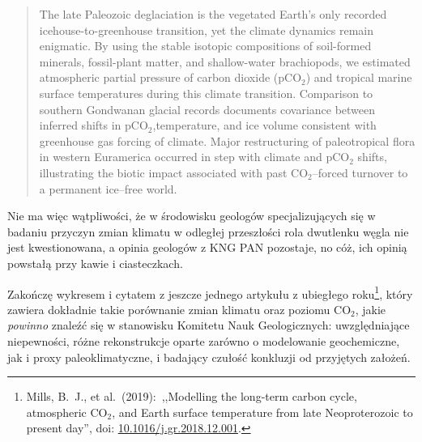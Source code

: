 \documentclass[12pt]{article}
\newcommand{\doi}[1]{doi: \href{htts://doi.org/#1}{#1}}
\begin{document}
\begin{quotation}
	The late Paleozoic deglaciation is the vegetated Earth’s only recorded icehouse-to-greenhouse transition, yet the climate dynamics remain enigmatic. By using the stable isotopic compositions of soil-formed minerals, fossil-plant matter, and shallow-water brachiopods, we estimated atmospheric partial pressure of carbon dioxide (pCO$_2$) and tropical marine surface temperatures during this climate transition. Comparison to southern Gondwanan glacial records documents covariance between inferred shifts in pCO$_2$,temperature, and ice volume consistent with greenhouse gas forcing of climate. Major restructuring of paleotropical flora in western Euramerica occurred in step with climate and pCO$_2$ shifts, illustrating the biotic impact associated with past CO$_2$--forced turnover to a permanent ice--free world.
\end{quotation}

Nie ma więc wątpliwości, że w środowisku geologów specjalizujących się w badaniu przyczyn zmian klimatu w odległej przeszłości rola dwutlenku węgla nie jest kwestionowana, a opinia geologów z KNG PAN pozostaje, no cóż, ich opinią powstałą przy kawie i ciasteczkach.
	
Zakończę wykresem i cytatem z jeszcze jednego artykułu z ubiegłego roku\footnote{Mills, B.~J., et al.~(2019):~,,Modelling the long-term carbon cycle, atmospheric CO$_2$, and Earth surface temperature from late Neoproterozoic to present day'', \doi{10.1016/j.gr.2018.12.001}.}, który zawiera dokładnie takie porównanie zmian klimatu oraz poziomu CO$_2$, jakie \emph{powinno} znaleźć się w stanowisku Komitetu Nauk Geologicznych: uwzględniające niepewności, różne rekonstrukcje oparte zarówno o modelowanie geochemiczne, jak i proxy paleoklimatyczne, i badający czułość konkluzji od przyjętych założeń.
\end{document}
